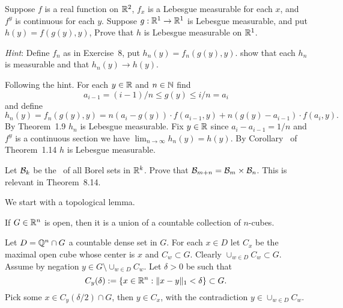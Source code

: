 \begin{enumerate}
\begin{excopy}
Suppose $f$ is a real function on \(\mathbb{R}^2\),
\(f_x\) is a Lebesgue measurable for each $x$,
and \(f^y\) is continuous for each $y$.
Suppose \(g: \mathbb{R}^1\to \mathbb{R}^1\) is Lebesgue measurable,
and put \mbox{\(h(y) = f(g(y),y)\)},
Prove that $h$ is Lebesgue measurable on \(\mathbb{R}^1\).

\emph{Hint}: Define \(f_n\) as in Exercise~8, put \(h_n(y) = f_n(g(y),y)\).
show that each \(h_n\) is measurable and that \(h_n(y) \to h(y)\).
\end{excopy}

Following the hint. For each \(y\in\mathbb{R}\) and \(n\in\mathbb{N}\)
find 
\begin{equation*}
a_{i-1} = (i-1)/n \leq g(y) \leq i/n = a_i
\end{equation*}
and define
\begin{equation*}
h_n(y) 
= f_n(g(y),y) 
= n\left(a_i-g(y)\right)\cdot f(a_{i-1},y) + n(g(y)-a_{i-1})\cdot f(a_i,y).
\end{equation*}
By Theorem~1.9 \(h_n\) is Lebesgue measurable.
Fix \(y\in\mathbb{R}\) since \(a_{i}-a_{i-1} = 1/n\) and \(f^y\) is a continuous section
we have \(\lim_{n\to\infty}h_n(y) = h(y)\).
By Corollary~ of Theorem~1.14 $h$ is Lebesgue measurable.


\begin{excopy}
Let \(\mathcal{B}_k\) be the \salgebra\ of all Borel sets in \(\mathbb{R}^k\).
Prove that \(\mathcal{B}_{m+n} = \mathcal{B}_m \times \mathcal{B}_n\).
This is relevant in Theorem~8.14.
\end{excopy}

We start with a topological lemma.
\begin{llem} \label{lem:open-countable}
If \(G\in\mathbb{R}^n\) is open, then it is a union of a countable collection
of $n$-cubes.
\end{llem}
\begin{thmproof}
Let \(D=\mathbb{Q}^n\cap G\) a countable dense set in $G$.
For each \(x\in D\) let \(C_x\) be the maximal open cube whose center is $x$
and \(C_w\subset G\). Clearly \(\cup_{w\in D} C_w \subset G\).
Assume by negation \(y\in G \setminus \cup_{w\in D} C_w\).
Let \(\delta>0\) be such that 
\begin{equation*}
C_y(\delta) := \{x\in \mathbb{R}^n: \|x-y\|_1<\delta\} \subset G.
\end{equation*}
Pick some \(x\in C_y(\delta/2)\cap G\), then 
\(y\in C_x\), with the contradiction \(y\in \cup_{w\in D} C_w\).
\end{thmproof}


\end{enumerate}
